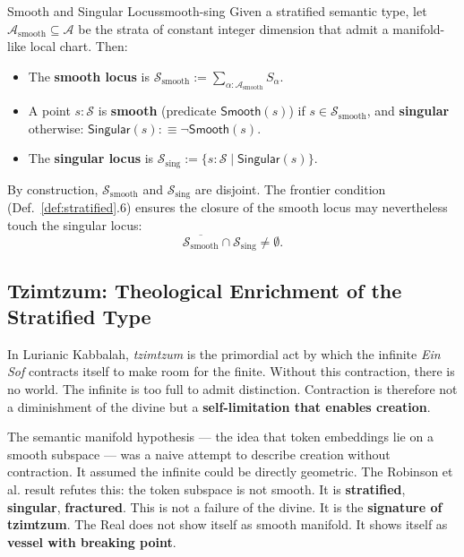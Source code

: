 \documentclass[11pt,a4paper]{article}
\begin{document}
\begin{defbox}{Smooth and Singular Locus}{smooth-sing}
Given a stratified semantic type, let $\mathcal{A}_{\mathrm{smooth}} \subseteq \mathcal{A}$ be the strata of constant integer dimension that admit a manifold-like local chart. Then:
\begin{itemize}
    \item The \textbf{smooth locus} is $\mathcal{S}_{\mathrm{smooth}} := \sum_{\alpha : \mathcal{A}_{\mathrm{smooth}}} S_\alpha$.
    \item A point $s : \mathcal{S}$ is \textbf{smooth} (predicate $\mathsf{Smooth}(s)$) if $s \in \mathcal{S}_{\mathrm{smooth}}$, and \textbf{singular} otherwise: $\mathsf{Singular}(s) :\equiv \neg \mathsf{Smooth}(s)$.
    \item The \textbf{singular locus} is $\mathcal{S}_{\mathrm{sing}} := \{ s : \mathcal{S} \mid \mathsf{Singular}(s) \}$.
\end{itemize}
By construction, $\mathcal{S}_{\mathrm{smooth}}$ and $\mathcal{S}_{\mathrm{sing}}$ are disjoint. The frontier condition (Def.~\ref{def:stratified}.6) ensures the closure of the smooth locus may nevertheless touch the singular locus:
\[
\overline{\mathcal{S}_{\mathrm{smooth}}} \cap \mathcal{S}_{\mathrm{sing}} \neq \emptyset.
\]
\end{defbox}

\subsection{Tzimtzum: Theological Enrichment of the Stratified Type}

In Lurianic Kabbalah, \emph{tzimtzum} is the primordial act by which the infinite \emph{Ein Sof} contracts itself to make room for the finite. Without this contraction, there is no world. The infinite is too full to admit distinction. Contraction is therefore not a diminishment of the divine but a \textbf{self-limitation that enables creation}.

The semantic manifold hypothesis — the idea that token embeddings lie on a smooth subspace — was a naive attempt to describe creation without contraction. It assumed the infinite could be directly geometric. The Robinson et al. result refutes this: the token subspace is not smooth. It is \textbf{stratified}, \textbf{singular}, \textbf{fractured}. This is not a failure of the divine. It is the \textbf{signature of tzimtzum}. The Real does not show itself as smooth manifold. It shows itself as \textbf{vessel with breaking point}.
\end{document}
